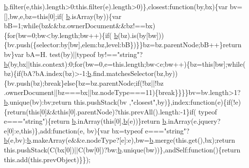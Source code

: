 \begin{DoxyCode}
      \hyperlink{jquery_8js_aa4026ad5544b958e54ce5e106fa1c805}{b}.filter(e,\textcolor{keyword}{this}).length>0:this.filter(e).length>0)\},closest:\textcolor{keyword}{function}(by,bx)\{var bv=[],bw,e,bz=\textcolor{keyword}{this}[0];\textcolor{keywordflow}{if}(
      \hyperlink{jquery_8js_aa4026ad5544b958e54ce5e106fa1c805}{b}.isArray(by))\{var bB=1;\textcolor{keywordflow}{while}(bz&&bz.ownerDocument&&bz!==bx)\{\textcolor{keywordflow}{for}(bw=0;bw<by.length;bw++)\{\textcolor{keywordflow}{if}(
      \hyperlink{jquery_8js_aa4026ad5544b958e54ce5e106fa1c805}{b}(bz).is(by[bw]))\{bv.push(\{selector:by[bw],elem:bz,level:bB\})\}\}bz=bz.parentNode;bB++\}\textcolor{keywordflow}{return} bv\}var bA=H.
      test(by)||typeof by!==\textcolor{stringliteral}{"string"}?\hyperlink{jquery_8js_aa4026ad5544b958e54ce5e106fa1c805}{b}(by,bx||this.context):0;\textcolor{keywordflow}{for}(bw=0,e=this.length;bw<e;bw++)\{bz=\textcolor{keyword}{this}[bw];\textcolor{keywordflow}{while}(
      bz)\{\textcolor{keywordflow}{if}(bA?bA.index(bz)>-1:\hyperlink{jquery_8js_aa4026ad5544b958e54ce5e106fa1c805}{b}.find.matchesSelector(bz,by))\{bv.push(bz);\textcolor{keywordflow}{break}\}\textcolor{keywordflow}{else}\{bz=bz.parentNode;\textcolor{keywordflow}{if}(!bz||!bz
      .ownerDocument||bz===bx||bz.nodeType===11)\{\textcolor{keywordflow}{break}\}\}\}\}bv=bv.length>1?\hyperlink{jquery_8js_aa4026ad5544b958e54ce5e106fa1c805}{b}.unique(bv):bv;\textcolor{keywordflow}{return} this.pushStack(bv
      ,\textcolor{stringliteral}{"closest"},by)\},index:\textcolor{keyword}{function}(e)\{\textcolor{keywordflow}{if}(!e)\{\textcolor{keywordflow}{return}(\textcolor{keyword}{this}[0]&&\textcolor{keyword}{this}[0].parentNode)?this.prevAll().length:-1\}\textcolor{keywordflow}{if}(
      typeof e===\textcolor{stringliteral}{"string"})\{\textcolor{keywordflow}{return} \hyperlink{jquery_8js_aa4026ad5544b958e54ce5e106fa1c805}{b}.inArray(\textcolor{keyword}{this}[0],\hyperlink{jquery_8js_aa4026ad5544b958e54ce5e106fa1c805}{b}(e))\}\textcolor{keywordflow}{return} \hyperlink{jquery_8js_aa4026ad5544b958e54ce5e106fa1c805}{b}.inArray(e.jquery?e[0]:e,\textcolor{keyword}{this})\},add:\textcolor{keyword}{function}(e,
      bv)\{var bx=typeof e===\textcolor{stringliteral}{"string"}?\hyperlink{jquery_8js_aa4026ad5544b958e54ce5e106fa1c805}{b}(e,bv):\hyperlink{jquery_8js_aa4026ad5544b958e54ce5e106fa1c805}{b}.makeArray(e&&e.nodeType?[e]:e),bw=\hyperlink{jquery_8js_aa4026ad5544b958e54ce5e106fa1c805}{b}.merge(this.\textcolor{keyword}{get}(),bx);\textcolor{keywordflow}{return} 
      this.pushStack(C(bx[0])||C(bw[0])?bw:\hyperlink{jquery_8js_aa4026ad5544b958e54ce5e106fa1c805}{b}.unique(bw))\},andSelf:\textcolor{keyword}{function}()\{\textcolor{keywordflow}{return} this.add(this.prevObject)\}\});\textcolor{keyword}{
}
\end{DoxyCode}
